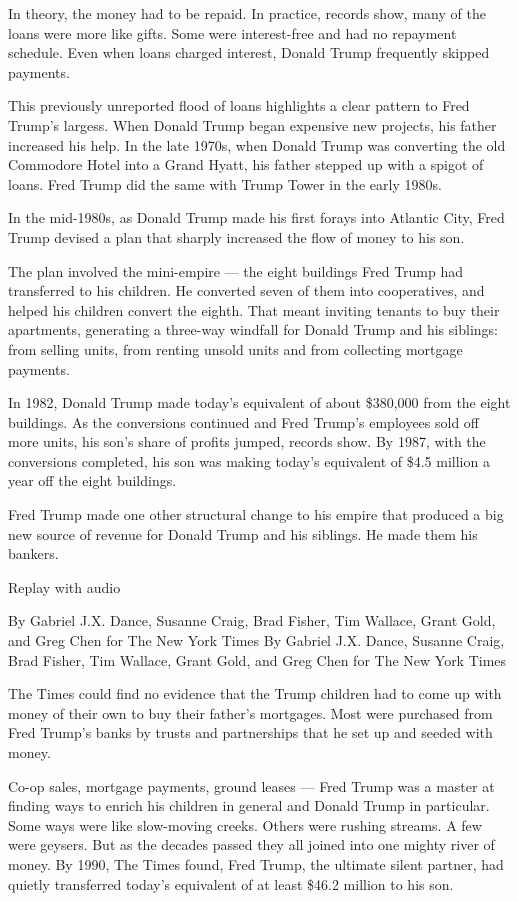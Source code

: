 In theory, the money had to be repaid. In practice, records show, many
of the loans were more like gifts. Some were interest-free and had no
repayment schedule. Even when loans charged interest, Donald Trump
frequently skipped payments.

This previously unreported flood of loans highlights a clear pattern to
Fred Trump's largess. When Donald Trump began expensive new projects,
his father increased his help. In the late 1970s, when Donald Trump was
converting the old Commodore Hotel into a Grand Hyatt, his father
stepped up with a spigot of loans. Fred Trump did the same with Trump
Tower in the early 1980s.

In the mid-1980s, as Donald Trump made his first forays into Atlantic
City, Fred Trump devised a plan that sharply increased the flow of money
to his son.

The plan involved the mini-empire --- the eight buildings Fred Trump had
transferred to his children. He converted seven of them into
cooperatives, and helped his children convert the eighth. That meant
inviting tenants to buy their apartments, generating a three-way
windfall for Donald Trump and his siblings: from selling units, from
renting unsold units and from collecting mortgage payments.

In 1982, Donald Trump made today's equivalent of about \$380,000 from
the eight buildings. As the conversions continued and Fred Trump's
employees sold off more units, his son's share of profits jumped,
records show. By 1987, with the conversions completed, his son was
making today's equivalent of \$4.5 million a year off the eight
buildings.

Fred Trump made one other structural change to his empire that produced
a big new source of revenue for Donald Trump and his siblings. He made
them his bankers.

Replay with audio

By Gabriel J.X. Dance, Susanne Craig, Brad Fisher, Tim Wallace, Grant
Gold, and Greg Chen for The New York Times By Gabriel J.X. Dance,
Susanne Craig, Brad Fisher, Tim Wallace, Grant Gold, and Greg Chen for
The New York Times

The Times could find no evidence that the Trump children had to come up
with money of their own to buy their father's mortgages. Most were
purchased from Fred Trump's banks by trusts and partnerships that he set
up and seeded with money.

Co-op sales, mortgage payments, ground leases --- Fred Trump was a
master at finding ways to enrich his children in general and Donald
Trump in particular. Some ways were like slow-moving creeks. Others were
rushing streams. A few were geysers. But as the decades passed they all
joined into one mighty river of money. By 1990, The Times found, Fred
Trump, the ultimate silent partner, had quietly transferred today's
equivalent of at least \$46.2 million to his son.

